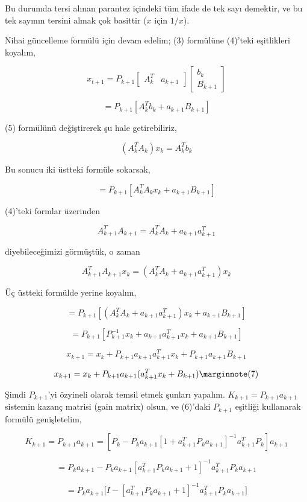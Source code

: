 \documentclass[12pt,fleqn]{article}\usepackage{../../common}
\begin{document}
Bu durumda tersi alınan parantez içindeki tüm ifade de tek sayı demektir,
ve bu tek sayının tersini almak çok basittir ($x$ için $1/x$). 

Nihai güncelleme formülü için devam edelim; (3) formülüne (4)'teki
eşitlikleri koyalım,

$$ x_{t+1} = 
P_{k+1} 
\left[\begin{array}{cc} A_k^T & a_{k+1} \end{array}\right]  
\left[\begin{array}{c} b_k \\ B_{k+1} \end{array}\right]  
$$

$$ = P_{k+1} [A_k^Tb_k + a_{k+1}B_{k+1} ] $$

(5) formülünü değiştirerek şu hale getirebiliriz,

$$ (A_k^TA_k) x_k = A_k^T b_k $$

Bu sonucu iki üstteki formüle sokarsak, 

$$ = P_{k+1} [A_k^TA_kx_k + a_{k+1}B_{k+1} ] $$

(4)'teki formlar üzerinden 

$$ A_{k+1}^TA_{k+1} =  A_k^TA_k + a_{k+1}a_{k+1}^T  $$

diyebileceğimizi görmüştük, o zaman 

$$ A_{k+1}^TA_{k+1}x_k =  (A_k^TA_k + a_{k+1}a_{k+1}^T)x_k  $$

Üç üstteki formülde yerine koyalım,

$$ = P_{k+1} [(A_k^TA_k + a_{k+1}a_{k+1}^T)x_k + a_{k+1}B_{k+1} ] $$

$$ = P_{k+1} [P_{k+1}^{-1}x_k + a_{k+1}a_{k+1}^Tx_k + a_{k+1}B_{k+1} ] $$

$$ x_{k+1} = x_k + P_{k+1}a_{k+1}a_{k+1}^Tx_k  + P_{k+1}a_{k+1}B_{k+1}  $$

$$ 
x_{k+1} = x_k + P_{k+1}a_{k+1}(a_{k+1}^Tx_k  + B_{k+1})  
\mlabel{7}
$$

Şimdi $P_{k+1}$'yi özyineli olarak temsil etmek şunları yapalım. $K_{k+1} =
P_{k+1}a_{k+1}$  sistemin kazanç matrisi (gain matrix) olsun, ve (6)'daki 
$P_{k+1}$ eşitliği kullanarak formülü genişletelim,

$$ K_{k+1} = P_{k+1}a_{k+1} = 
[ P_k - P_k a_{k+1} [ 1 + a_{k+1}^T P_k a_{k+1} ]^{-1} a_{k+1}^TP_k ] a_{k+1}
$$

$$ = P_ka_{k+1} - P_k a_{k+1}[a_{k+1}^T P_k a_{k+1} + 1]^{-1} a_{k+1}^TP_ka_{k+1} $$

$$ = P_ka_{k+1} 
\big[ I - [ a_{k+1}^T P_k a_{k+1} + 1 ]^{-1} a_{k+1}^TP_ka_{k+1} \big] $$
\end{document}
